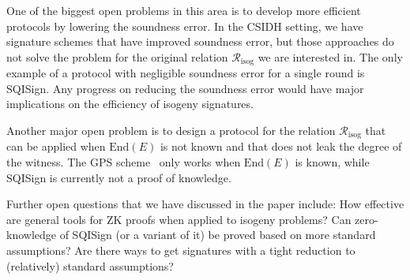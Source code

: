 \documentclass{llncs}
\newcommand{\R}[1][]{\ensuremath{\mathcal{R}_{\mathrm{#1}}}}
\newcommand{\End}{\text{End}}
\begin{document}
One of the biggest open problems in this area is to develop more efficient protocols by lowering the soundness error.
In the CSIDH setting, we have signature schemes that have improved soundness error, but those approaches do not solve the problem for the original relation $\R[isog]$ we are interested in.
The only example of a protocol with negligible soundness error for a single round is SQISign.
Any progress on reducing the soundness error would have major implications on the efficiency of isogeny signatures.

Another major open problem is to design a protocol for the relation $\R[isog]$ that can be applied when $\End(E)$ is not known and that does not leak the degree of the witness. The GPS scheme~\cite{GPS20} only works when $\End(E)$ is known, while SQISign is currently not a proof of knowledge.


Further open questions that we have discussed in the paper include:
How effective are general tools for ZK proofs when applied to isogeny problems?
Can zero-knowledge of SQISign (or a variant of it) be proved based on more standard assumptions?
Are there ways to get signatures with a tight reduction to (relatively) standard assumptions?




\end{document}
